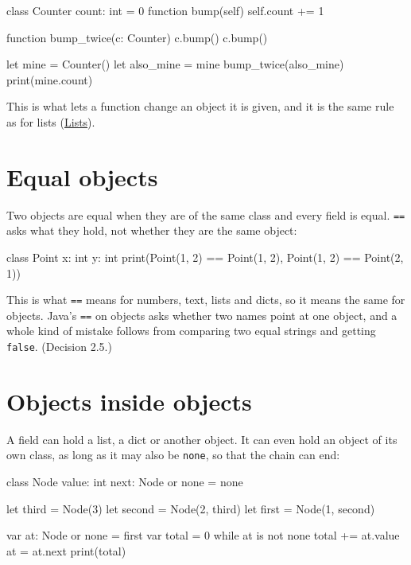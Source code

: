 \begin{zeno}
class Counter {
    count: int = 0
    function bump(self) {
        self.count += 1
    }
}

function bump_twice(c: Counter) {
    c.bump()
    c.bump()
}

let mine = Counter()
let also_mine = mine
bump_twice(also_mine)
print(mine.count)
\end{zeno}

This is what lets a function change an object it is given, and it is
the same rule as for lists (\hyperref[ch-lists]{Lists}).

\section{Equal objects}

Two objects are equal when they are of the same class and every field
is equal. \verb|==| asks what they hold, not whether they are the same
object:

\begin{zeno}
class Point {
    x: int
    y: int
}
print(Point(1, 2) == Point(1, 2), Point(1, 2) == Point(2, 1))
\end{zeno}

\begin{why}
This is what \verb|==| means for numbers, text, lists and dicts, so it
means the same for objects. Java's \verb|==| on objects asks whether
two names point at one object, and a whole kind of mistake follows
from comparing two equal strings and getting \verb|false|.
(Decision 2.5.)
\end{why}

\section{Objects inside objects}

A field can hold a list, a dict or another object. It can even hold an
object of its own class, as long as it may also be \verb|none|, so that
the chain can end:

\begin{zeno}
class Node {
    value: int
    next: Node or none = none
}

let third = Node(3)
let second = Node(2, third)
let first = Node(1, second)

var at: Node or none = first
var total = 0
while at is not none {
    total += at.value
    at = at.next
}
print(total)
\end{zeno}

